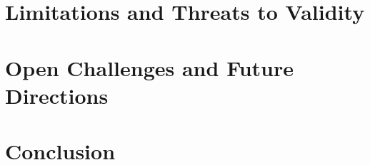 \documentclass[journal]{IEEEtran}
\begin{document}



\section{Limitations and Threats to Validity}\label{sec:limits}


\section{Open Challenges and Future Directions}\label{sec:future}


\section{Conclusion}\label{sec:conclusion}




\clearpage  %





\end{document}
